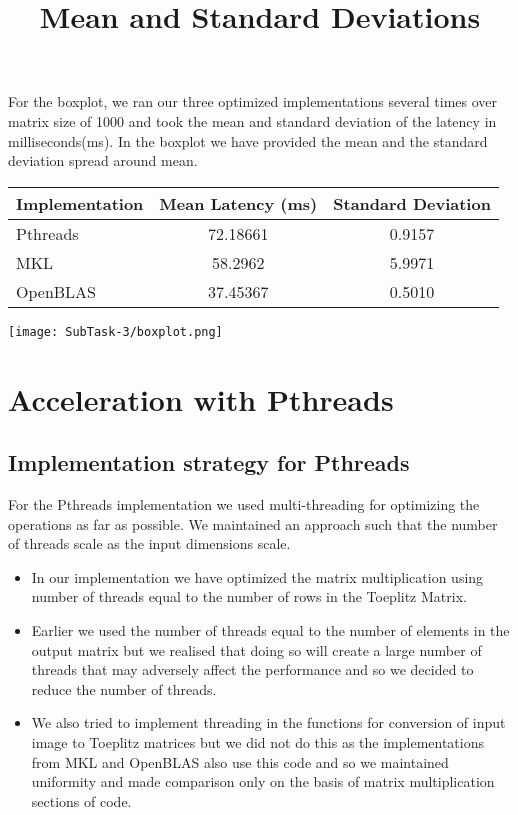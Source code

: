 \documentclass[10pt,a4paper,titlepage]{article}
\begin{document}
For the boxplot, we ran our three optimized implementations several times over matrix size of 1000 and took the mean and standard deviation of the latency in milliseconds(ms). In the boxplot we have provided the mean and the standard deviation spread around mean.
\newline
\begin{center}

\title{\begin{Large}
Mean and Standard Deviations
\end{Large}}
\newline
\newline

\begin{tabular}{l|c|c}
\textbf{Implementation} & \textbf{Mean Latency (ms)} & \textbf{Standard Deviation}\\
\hline
Pthreads & 72.18661 & 0.9157 \\
MKL & 58.2962 & 5.9971 \\
OpenBLAS & 37.45367 & 0.5010 \\
\end{tabular}

\texttt{[image: SubTask-3/boxplot.png]} 

\end{center}

\section{Acceleration with Pthreads}
\subsection{Implementation strategy for Pthreads}
For the Pthreads implementation we used multi-threading\cite{Tutor} for optimizing the operations as far as possible. We maintained an approach such that the number of threads scale as the input dimensions scale.
\begin{itemize}
\item In our implementation we have optimized the matrix multiplication using number of threads equal to the number of rows in the Toeplitz Matrix.
\item Earlier we used the number of threads equal to the number of elements in the output matrix but we realised that doing so will create a large number of threads that may adversely affect the performance and so we decided to reduce the number of threads.
\item We also tried to implement threading in the functions for conversion of input image to Toeplitz matrices but we did not do this as the implementations from MKL and OpenBLAS also use this code and so we maintained uniformity and made comparison only on the basis of matrix multiplication sections of code.
\end{itemize}
\end{document}
